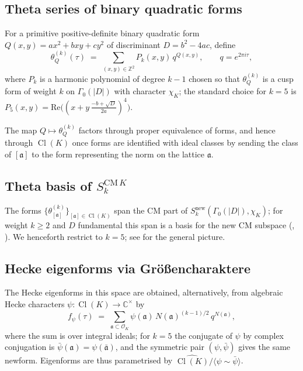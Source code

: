 \documentclass[11pt]{amsart}
\theoremstyle{definition}
\theoremstyle{remark}
\DeclareMathOperator{\Cl}{Cl}
\newcommand{\Z}{\mathbb{Z}}
\newcommand{\C}{\mathbb{C}}
\newcommand{\OK}{\mathcal{O}_K}
\newcommand{\chiK}{\chi_K}
\begin{document}
\subsection{Theta series of binary quadratic forms}
For a primitive positive-definite binary quadratic form
\(Q(x,y) = ax^2 + bxy + cy^2\) of discriminant \(D = b^2 - 4ac\),
define
\begin{equation}
  \theta_Q^{(k)}(\tau) \;=\; \sum_{(x,y)\in \Z^2} P_k(x,y) \,
  q^{Q(x,y)}, \qquad q = e^{2\pi i \tau},
\end{equation}
where \(P_k\) is a harmonic polynomial of degree \(k-1\) chosen so
that \(\theta_Q^{(k)}\) is a cusp form of weight \(k\) on
\(\Gamma_0(|D|)\) with character \(\chiK\); the standard choice for
\(k=5\) is
\(P_5(x,y) = \mathrm{Re}\bigl((x + y\,\tfrac{-b+\sqrt{D}}{2a})^4\bigr)\).

The map \(Q \mapsto \theta_Q^{(k)}\) factors through proper
equivalence of forms, and hence through \(\Cl(K)\) once forms are
identified with ideal classes by sending the class of
\([\mathfrak a]\) to the form representing the norm on the lattice
\(\mathfrak a\).

\subsection{Theta basis of \(S_k^{\mathrm{CM}\,K}\)}
The forms \(\{\theta_{[\mathfrak a]}^{(k)}\}_{[\mathfrak a]\in \Cl(K)}\)
span the CM part of \(S_k^{\mathrm{new}}(\Gamma_0(|D|), \chiK)\); for
weight \(k \ge 2\) and \(D\) fundamental this span is a basis for the
new CM subspace (\cite[Thm.~4.8.2]{Miyake2006}, \cite{Shimura1971}).
We henceforth restrict to \(k=5\); see  for the general
picture.

\subsection{Hecke eigenforms via Gr\"o\ss encharaktere}
The Hecke eigenforms in this space are obtained, alternatively, from
algebraic Hecke characters \(\psi : \Cl(K) \to \C^\times\) by
\begin{equation}\label{eq:Hecke-theta}
  f_\psi(\tau) \;=\; \sum_{\mathfrak a \subset \OK} \psi(\mathfrak a)\,
  N(\mathfrak a)^{(k-1)/2}\, q^{N(\mathfrak a)} ,
\end{equation}
where the sum is over integral ideals; for \(k=5\) the conjugate of
\(\psi\) by complex conjugation is
\(\bar\psi(\mathfrak a) = \psi(\bar{\mathfrak a})\), and the symmetric
pair \((\psi, \bar\psi)\) gives the same newform. Eigenforms are thus
parametrised by \(\widehat{\Cl(K)}/\langle \psi \sim \bar\psi \rangle\).
\end{document}
